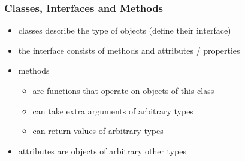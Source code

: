 \documentclass{slides}
\begin{document}
\begin{frame}
  \frametitle{Classes, Interfaces and Methods}

  \begin{center}
  \end{center}

	\begin{itemize}
    \item \alert{classes} describe the type of objects (define their \alert{interface})
    \item the interface consists of \alert{methods} and \alert{attributes} / properties
    \item methods
      \begin{itemize}
      \item are functions that operate on objects of this class
      \item can take extra arguments of arbitrary types
      \item can return values of arbitrary types
      \end{itemize}
    \item attributes are objects of arbitrary other types
  \end{itemize}
\end{frame}
\end{document}
